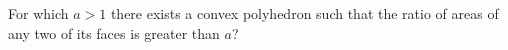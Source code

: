 \problem
For which $a > 1$ there exists a convex polyhedron such that the ratio of
areas of any two of its faces is greater than $a$?

\solution
\endproblem

